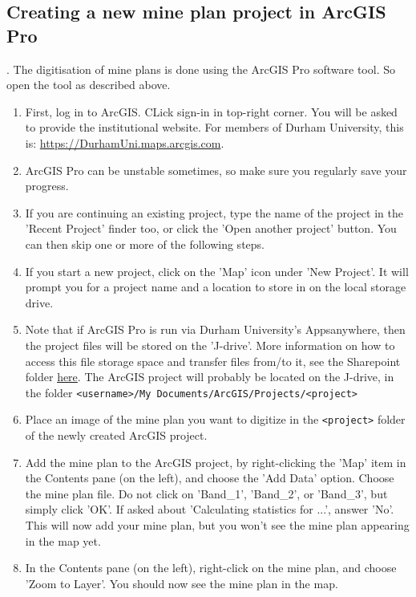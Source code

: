 \subsection{Creating a new mine plan project in ArcGIS Pro}.
The digitisation of mine plans is done using the ArcGIS Pro software tool. So open the tool as described above.
\begin{enumerate}
    \item First, log in to ArcGIS. CLick sign-in in top-right corner. You will be asked to provide the institutional website. For members of Durham University, this is: \url{https://DurhamUni.maps.arcgis.com}. 
    \item ArcGIS Pro can be unstable sometimes, so make sure you regularly save your progress. 
    \item If you are continuing an existing project, type the name of the project in the 'Recent Project' finder too, or click the 'Open another project' button. You can then skip one or more of the following steps.
    \item If you start a new project, click on the 'Map' icon under 'New Project'. It will prompt you for a project name and a location to store in on the local storage drive.
    \item Note that if ArcGIS Pro is run via Durham University's Appsanywhere, then the project files will be stored on the 'J-drive'. More information on how to access this file storage space and transfer files from/to it, see the Sharepoint folder \href{https://durhamuniversity.sharepoint.com/sites/MyDigitalDurham/SitePages/ServicePage.aspx?Service=%22Personal%20Storage%20%28J%20Drive%29%22}{here}. The ArcGIS project will probably be located on the J-drive, in the folder {\tt <username>/My Documents/ArcGIS/Projects/<project>}
    \item Place an image of the mine plan you want to digitize in the {\tt <project>} folder of the newly created ArcGIS project.
    \item Add the mine plan to the ArcGIS project, by right-clicking the 'Map' item in the Contents pane (on the left), and choose the 'Add Data' option. Choose the mine plan file. Do not click on 'Band\_1', 'Band\_2', or 'Band\_3', but simply click 'OK'. If asked about 'Calculating statistics for ...', answer 'No'. This will now add your mine plan, but you won't see the mine plan appearing in the map yet.
    \item In the Contents pane (on the left), right-click on the mine plan, and choose 'Zoom to Layer'. You should now see the mine plan in the map.

\end{enumerate}
